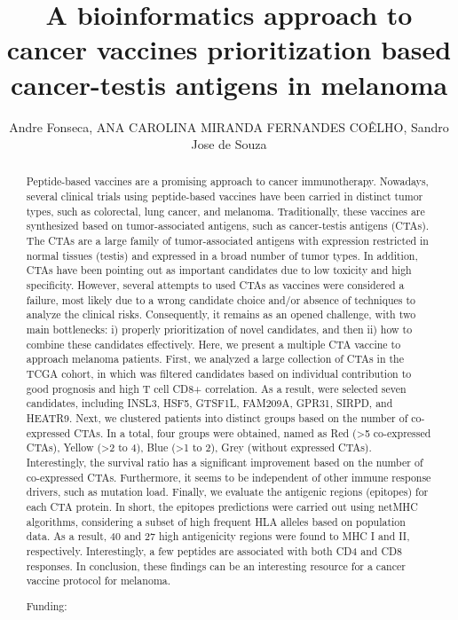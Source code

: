 \documentclass[twoside]{article}
\title{\vspace{-15mm}\fontsize{24pt}{10pt}\selectfont\textbf{ A bioinformatics approach to cancer vaccines prioritization based cancer-testis antigens in melanoma }} %
\author{ Andre Fonseca, ANA CAROLINA MIRANDA FERNANDES CO\^ELHO, Sandro Jose de Souza }
\affil{ USP }
\date{}
\begin{document}
  
  
  \maketitle %
  
  
  \thispagestyle{fancy} %
  
  
  \begin{abstract}
  Peptide-based vaccines are a promising approach to cancer immunotherapy. Nowadays,  several clinical trials using peptide-based vaccines have been carried in distinct tumor types,  such as colorectal,  lung cancer,  and melanoma. Traditionally,  these vaccines are synthesized based on tumor-associated antigens,  such as cancer-testis antigens (CTAs). The CTAs are a large family of tumor-associated antigens with expression restricted in normal tissues (testis) and expressed in a broad number of tumor types. In addition,  CTAs have been pointing out as important candidates due to low toxicity and high specificity. However,  several attempts to used CTAs as vaccines were considered a failure,  most likely due to a wrong candidate choice and/or absence of techniques to analyze the clinical risks. Consequently,  it remains as an opened challenge,  with two main bottlenecks: i) properly prioritization of novel candidates,  and then ii) how to combine these candidates effectively. Here,  we present a multiple CTA vaccine to approach melanoma patients. First,  we analyzed a large collection of CTAs in the TCGA cohort,  in which was filtered candidates based on individual contribution to good prognosis and high T cell CD8+ correlation. As a result,  were selected seven candidates,  including INSL3,  HSF5,  GTSF1L,  FAM209A,  GPR31,  SIRPD,  and HEATR9. Next,  we clustered patients into distinct groups based on the number of co-expressed CTAs. In a total,  four groups were obtained,  named as Red (>5 co-expressed CTAs),   Yellow (>2 to 4),  Blue (>1 to 2),  Grey (without expressed CTAs). Interestingly,  the survival ratio has a significant improvement based on the number of co-expressed CTAs. Furthermore,  it seems to be independent of other immune response drivers,  such as mutation load. Finally,  we evaluate the antigenic regions (epitopes) for each CTA protein. In short,  the epitopes predictions were carried out using netMHC algorithms,  considering a subset of high frequent HLA alleles based on population data. As a result,  40 and 27 high antigenicity regions were found to MHC I and II,  respectively. Interestingly,  a few peptides are associated with both CD4 and CD8 responses. In conclusion,  these findings can be an interesting resource for a cancer vaccine protocol for melanoma.
  
  Funding:  \\ 
  \end{abstract}
  
\end{document}
